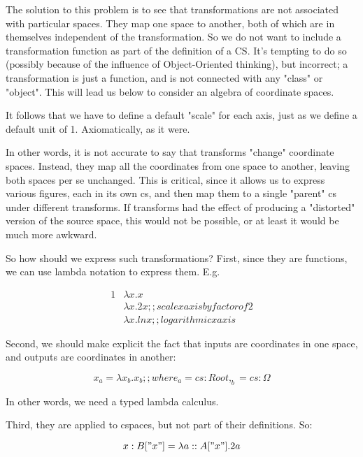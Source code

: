 \documentclass[reqno,12pt]{tufte-handout}
\numberwithin{equation}{subsection}
\numberwithin{equation}{subsection}
\begin{document}
  The solution to this problem is to see that transformations are not
  associated with particular spaces.  They map one space to another,
  both of which are in themselves independent of the transformation.  So
  we do not want to include a transformation function as part of the
  definition of a CS.  It's tempting to do so (possibly because of the
  influence of Object-Oriented thinking), but incorrect; a
  transformation is just a function, and is not connected with any
  "class" or "object".  This will lead us below to consider an algebra
  of coordinate spaces.

  It follows that we have to define a default "scale" for each axis,
  just as we define a default unit of 1.  Axiomatically, as it were.

  In other words, it is not accurate to say that transforms "change"
  coordinate spaces.  Instead, they map all the coordinates from one
  space to another, leaving both spaces per se unchanged.  This is
  critical, since it allows us to express various figures, each in its
  own cs, and then map them to a single "parent" cs under different
  transforms.  If transforms had the effect of producing a "distorted"
  version of the source space, this would not be possible, or at least
  it would be much more awkward.

  So how should we express such transformations?  First, since they are
  functions, we can use lambda notation to express them.  E.g.

  {
    \begin{alignat}{1}
      & \lambda x.x \\
      & \lambda x.2x   ;; scale x axis by factor of 2 \\
      & \lambda x.ln x ;; logarithmic x axis
    \end{alignat}
  }

  Second, we should make explicit the fact that inputs are coordinates
  in one space, and outputs are coordinates in another:

  $$x_a = \lambda x_b.x_b  ;; where _a = cs:Root, _b = cs:\Omega$$

  In other words, we need a typed lambda calculus.

  Third, they are applied to cspaces, but not part of their definitions.
  So:

  \begin{equation}
    x:B["x"] = \lambda a::A["x"].2a
  \end{equation}
\end{document}
